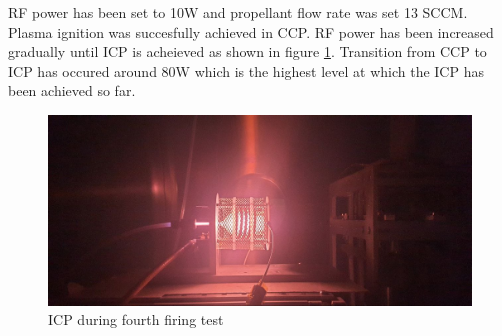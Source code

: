 RF power has been set to 10W and propellant flow rate was set 13 SCCM. Plasma ignition was succesfully achieved in CCP. RF power has been increased gradually until ICP is acheieved as shown in figure \ref{fig:4th_icp}. Transition from CCP to ICP has occured around 80W which is the highest level at which the ICP has been achieved so far. 

\begin{figure}[ht]
    \centering
    \includegraphics[width=\linewidth]{fig/deneme4/test4_icp.jpeg}
    \caption{ICP during fourth firing test}
    \label{fig:4th_icp}
\end{figure}

